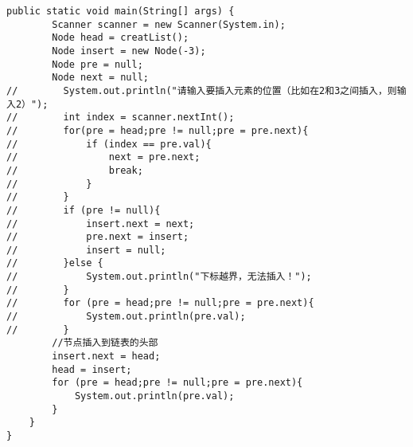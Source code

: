 \documentclass[a4paper]{report}
\begin{document}
\begin{lstlisting}[title = 链表的插入删除操作]
    public static void main(String[] args) {
        Scanner scanner = new Scanner(System.in);
        Node head = creatList();
        Node insert = new Node(-3);
        Node pre = null;
        Node next = null;
//        System.out.println("请输入要插入元素的位置（比如在2和3之间插入，则输入2）");
//        int index = scanner.nextInt();
//        for(pre = head;pre != null;pre = pre.next){
//            if (index == pre.val){
//                next = pre.next;
//                break;
//            }
//        }
//        if (pre != null){
//            insert.next = next;
//            pre.next = insert;
//            insert = null;
//        }else {
//            System.out.println("下标越界，无法插入！");
//        }
//        for (pre = head;pre != null;pre = pre.next){
//            System.out.println(pre.val);
//        }
        //节点插入到链表的头部
        insert.next = head;
        head = insert;
        for (pre = head;pre != null;pre = pre.next){
            System.out.println(pre.val);
        }
    }
}
\end{lstlisting}
\end{document}
